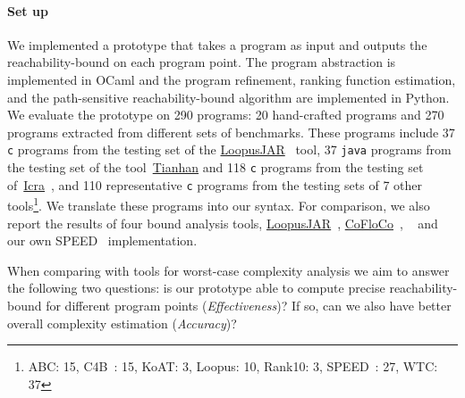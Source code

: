 \paragraph{Set up} We implemented a prototype {\PSRB} that takes a program as input 
and outputs the reachability-bound on each program point.
The 
program abstraction is implemented in OCaml and the program refinement, ranking function estimation, and the path-sensitive reachability-bound algorithm are implemented in Python.
We evaluate the prototype on 290 programs: 20 hand-crafted programs and 270 programs extracted from different sets of benchmarks. 
These programs include  37 {\tt c} programs 
from the testing set of the \hyperlink{https://forsyte.at/static/people/sinn/loopusJAR/index.html}{LoopusJAR}~\cite{BenchmarkLoopus} tool,
37 {\tt java} programs from the testing set of the tool~\hyperlink{https://zenodo.org/record/5140586\#.Y5pBoC-B1QI}{Tianhan}\cite{BenchmarkTianhan,LuCT21} 
and 118 {\tt c} programs from the testing set of~\hyperlink{https://github.com/icra-team/icra}{Icra}~\cite{KincaidBCR19,CyphertBKR19}, and 110 representative {\tt c} programs from the testing sets of 7 other tools\footnote{ABC: 15, C4B~: 15, KoAT: 3, Loopus: 10, Rank10: 3, SPEED~\cite{GulwaniJK09,GulwaniZ10,GulwaniMC09}: 27, WTC: 37}.
%
We translate these programs into our syntax.
For comparison, we also report the results of four bound analysis tools, 
\hyperlink{https://forsyte.at/software/loopus/}{LoopusJAR}~\cite{SinnZV17},
\hyperlink{https://github.com/aeflores/CoFloCo/tree/master/src}{CoFloCo}~\cite{ToolCofloco},
~\cite{BenchmarkTianhan}
and our own SPEED~\cite{GulwaniJK09} implementation.

When comparing with tools for worst-case
complexity analysis we aim to answer the following two questions: is our prototype able to compute precise reachability-bound for different program points (\emph{Effectiveness})? If so, can we also have better overall complexity estimation (\emph{Accuracy})?

